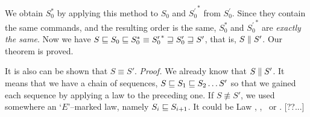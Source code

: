 We obtain \(S_0^*\) by applying this method to \(S_0\) and
\({S^\prime_0}^*\) from \(S^\prime_0\). Since they contain the same
commands, and the resulting order is the same,
\(S_0^*\) and
\({S^\prime_0}^*\) are \emph{exactly the same}. Now we have
\(S\sqsubseteq S_0\sqsubseteq S_0^*\equiv{S^\prime_0}^*\sqsupseteq S^\prime_0\sqsupseteq
S^\prime\), that is, \(S\parallel S^\prime\). Our theorem is proved.
\begin{forrsi}
\end{forrsi}

\begin{CMNT}
It is also can be shown that 
\(S\equiv S'\). \emph{Proof.} We already know
that \(S\parallel S'\). It means that we have a chain of sequences, 
\(S\sqsubseteq S_1\sqsubseteq S_2\ldots S'\) so that we gained each sequence by
applying a law to the preceding one. If \(S\not\equiv S'\), we used
somewhere an `\(E\)'--marked law, namely \(S_i\sqsubseteq S_{i+1}\). It could 
be Law \lawiib, \lawxxiv, \lawxxvii~or \lawxxviii. [??...]
\end{CMNT}

